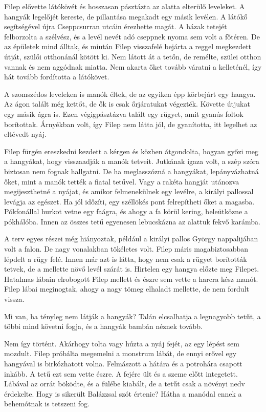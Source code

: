 \documentclass[10pt]{memoir}
\begin{document}
Filep elővette látókövét és hosszasan pásztázta az alatta elterülő leveleket. A
hangyák legelőjét kereste, de pillantása megakadt egy másik levélen. A látókő
segítségével újra Cseppcsurran utcáin érezhette magát. A házak tetejét
felborzolta a szélvész, és a levél nevét adó cseppnek nyoma sem volt a főtéren.
De az épületek mind álltak, és miután Filep visszafelé bejárta a reggel
megkezdett útját, szülői otthonánál kötött ki. Nem látott át a tetőn, de
remélte, szülei otthon vannak és nem aggódnak miatta. Nem akarta őket tovább
váratni a kelleténél, így hát tovább fordította a látókövet.

A szomszédos leveleken is manók éltek, de az egyiken épp körbejárt egy hangya.
Az ágon talált még kettőt, de ők is csak őrjáratukat végezték. Követte útjukat
egy másik ágra is. Ezen végigpásztázva talált egy rügyet, amit gyanús foltok
borítottak. Árnyékban volt, így Filep nem látta jól, de gyanította, itt
legelhet az eltévedt nyáj.

Filep fürgén ereszkedni kezdett a kérgen és közben átgondolta, hogyan győzi meg
a hangyákat, hogy visszaadják a manók tetveit. Jutkának igaza volt, a szép
szóra biztosan nem fognak hallgatni. De ha meglasszózná a hangyákat,
lepányvázhatná őket, mint a manók tették a fiatal tetűvel. Vagy a rakéta
hangját utánozva megijeszthetné a nyájat, és amikor felmenekülnek egy levélre,
a királyi pallossal levágja az egészet. Ha jól időzíti, egy széllökés pont
felrepítheti őket a magasba. Pókfonállal hurkot vetne egy faágra, és ahogy a fa
körül kering, beleütközne a pókhálóba. Innen az összes tetű egyenesen
lebucskázna az alattuk fekvő karámba.

A terv egyes részei még hiányoztak, például a királyi pallos György
nappalijában volt a falon. De nagy vonalakban tökéletes volt. Filep máris
magabiztosabban lépdelt a rügy felé. Innen már azt is látta, hogy nem csak a
rügyet borították tetvek, de a mellette növő levél szárát is. Hirtelen egy
hangya előzte meg Filepet. Hatalmas lábain elrobogott Filep mellett és észre
sem vette a harcra kész manót. Filep lábai meginogtak, ahogy a nagy tömeg
elhaladt mellette, de nem fordult vissza.

Mi van, ha tényleg nem látják a hangyák? Talán elcsalhatja a legnagyobb tetűt,
a többi mind követni fogja, és a hangyák bambán néznek tovább.

Nem így történt. Akárhogy tolta vagy húzta a nyáj fejét, az egy lépést sem
mozdult. Filep próbálta megemelni a monstrum lábát, de ennyi erővel egy
hangyával is birkózhatott volna. Felmászott a hátára és a potrohára csapott
inkább. A tetű ezt sem vette észre. A fejére ült és a szeme előtt integetett.
Lábával az orrát böködte, és a fülébe kiabált, de a tetűt csak a növényi nedv
érdekelte. Hogy is sikerült Balázzsal szót értenie? Hátha a manódal ennek a
behemótnak is tetszeni fog.
\end{document}
